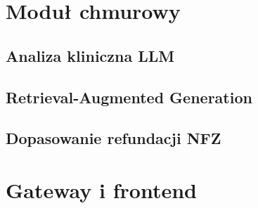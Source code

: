 \section{Moduł chmurowy}\label{sec:impl-cloud}

\subsection{Analiza kliniczna LLM}\label{sec:llm-impl}

%

\subsection{Retrieval-Augmented Generation}\label{sec:rag-impl}

%

\subsection{Dopasowanie refundacji NFZ}\label{sec:nfz-impl}

%

\section{Gateway i frontend}\label{sec:impl-gateway-frontend}

